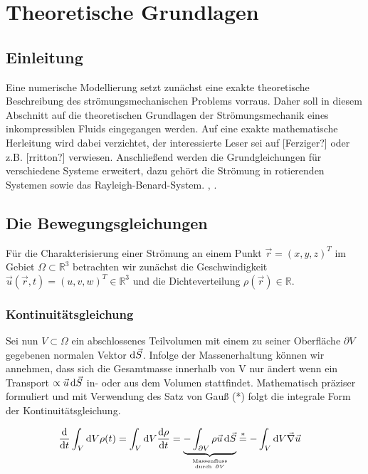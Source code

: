 \chapter{Theoretische Grundlagen}

\section{Einleitung}

Eine numerische Modellierung setzt zunächst eine exakte theoretische Beschreibung des strömungsmechanischen Problems vorraus.
Daher soll in diesem Abschnitt auf die theoretischen Grundlagen der Strömungsmechanik eines inkompressiblen Fluids eingegangen werden.
Auf eine exakte mathematische Herleitung wird dabei verzichtet, der interessierte Leser sei auf [Ferziger?] oder z.B. [rritton?] verwiesen.
Anschließend werden die Grundgleichungen für verschiedene Systeme erweitert, dazu gehört die Strömung in rotierenden Systemen sowie das Rayleigh-Benard-System.
\citep{Fadlun2000}, \citet{Fadlun2000}.

\section{Die Bewegungsgleichungen}

Für die Charakterisierung einer Strömung an einem Punkt $\vec{r} = (x, y, z)^T$  im Gebiet $\Omega \subset \mathbb{R}^3$ betrachten wir zunächst
die Geschwindigkeit $\vec{u}(\vec{r}, t) = (u, v, w)^T \in \mathbb{R}^3$ und die Dichteverteilung $\rho(\vec{r}) \in \mathbb{R}$.

\subsection{Kontinuitätsgleichung}

Sei nun $V \subset \Omega$  ein abschlossenes Teilvolumen mit einem zu seiner Oberfläche $\partial V$ gegebenen normalen Vektor $\mathop{}\!\mathrm{d} \vec{S}$.
Infolge der Massenerhaltung können wir annehmen, dass sich die Gesamtmasse innerhalb von V nur ändert wenn ein
Transport $\propto \vec{u}\mathop{}\!\mathrm{d} \vec{S}$ in- oder aus dem Volumen stattfindet.
Mathematisch präziser formuliert und mit Verwendung des Satz von Gauß (*) folgt die integrale Form der Kontinuitätsgleichung.

\begin{align}
    \frac{\dif}{\dif t} \int_{V}\dif V \rho(t) =  \int_{V}\dif V \frac{\dif \rho}{\dif t}  &= \underbrace{-\int_{\partial V}
     \rho \vec{u}\dif \vec{S}}_{\mathrm{Massenfluss} \atop \mathrm{durch \ } \partial V} \overset{*}{=} -\int_V \dif V \vec{\nabla}\vec{u}
\end{align}

